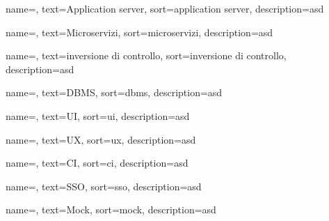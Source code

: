 {
    name=,
    text=Application server,
    sort=application server,
    description=asd
}

{
    name=,
    text=Microservizi,
    sort=microservizi,
    description=asd
}

{
    name=,
    text=inversione di controllo,
    sort=inversione di controllo,
    description=asd
}

{
    name=,
    text=DBMS,
    sort=dbms,
    description=asd
}

{
    name=,
    text=UI,
    sort=ui,
    description=asd
}

{
    name=,
    text=UX,
    sort=ux,
    description=asd
}

{
    name=,
    text=CI,
    sort=ci,
    description=asd
}

{
    name=,
    text=SSO,
    sort=sso,
    description=asd
}

{
    name=,
    text=Mock,
    sort=mock,
    description=asd
}